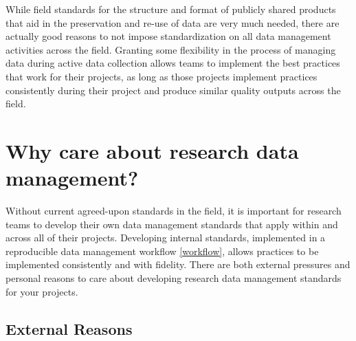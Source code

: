 \documentclass[
]{book}
\begin{document}
While field standards for the structure and format of publicly shared products that aid in the preservation and re-use of data are very much needed, there are actually good reasons to not impose standardization on all data management activities across the field. Granting some flexibility in the process of managing data during active data collection allows teams to implement the best practices that work for their projects, as long as those projects implement practices consistently during their project and produce similar quality outputs across the field.

\hypertarget{why-care-about-research-data-management}{%
\section{Why care about research data management?}\label{why-care-about-research-data-management}}

Without current agreed-upon standards in the field, it is important for research teams to develop their own data management standards that apply within and across all of their projects. Developing internal standards, implemented in a reproducible data management workflow \ref{workflow}, allows practices to be implemented consistently and with fidelity. There are both external pressures and personal reasons to care about developing research data management standards for your projects.

\hypertarget{external-reasons}{%
\subsection{External Reasons}\label{external-reasons}}
\end{document}
